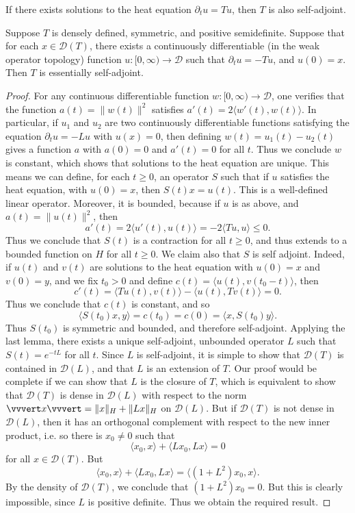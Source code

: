 If there exists solutions to the heat equation $\partial_t u = Tu$, then $T$ is also self-adjoint.

\begin{theorem}
    Suppose $T$ is densely defined, symmetric, and positive semidefinite. Suppose that for each $x \in \mathcal{D}(T)$, there exists a continuously differentiable (in the weak operator topology) function $u: [0,\infty) \to \mathcal{D}$ such that $\partial_t u = - Tu$, and $u(0) = x$. Then $T$ is essentially self-adjoint.
\end{theorem}
\begin{proof}
    For any continuous differentiable function $w: [0,\infty) \to \mathcal{D}$, one verifies that the function $a(t) = \| w(t) \|^2$ satisfies $a'(t) = 2 \langle w'(t), w(t) \rangle$. In particular, if $u_1$ and $u_2$ are two continuously differentiable functions satisfying the equation $\partial_t u = - Lu$ with $u(x) = 0$, then defining $w(t) = u_1(t) - u_2(t)$ gives a function $a$ with $a(0) = 0$ and $a'(t) = 0$ for all $t$. Thus we conclude $w$ is constant, which shows that solutions to the heat equation are unique. This means we can define, for each $t \geq 0$, an operator $S$ such that if $u$ satisfies the heat equation, with $u(0) = x$, then $S(t) x = u(t)$. This is a well-defined linear operator. Moreover, it is bounded, because if $u$ is as above, and $a(t) = \| u(t) \|^2$, then
    \[ a'(t) = 2 \langle u'(t), u(t) \rangle = - 2 \langle Tu, u \rangle \leq 0. \]
    Thus we conclude that $S(t)$ is a contraction for all $t \geq 0$, and thus extends to a bounded function on $H$ for all $t \geq 0$. We claim also that $S$ is self adjoint. Indeed, if $u(t)$ and $v(t)$ are solutions to the heat equation with $u(0) = x$ and $v(0) = y$, and we fix $t_0 > 0$ and define $c(t) = \langle u(t), v(t_0 - t) \rangle$, then
    \[ c'(t) = \langle Tu(t), v(t) \rangle - \langle u(t), Tv(t) \rangle = 0. \]
    Thus we conclude that $c(t)$ is constant, and so
    \[ \langle S(t_0) x, y \rangle = c(t_0) = c(0) = \langle x, S(t_0) y \rangle. \]
    Thus $S(t_0)$ is symmetric and bounded, and therefore self-adjoint. Applying the last lemma, there exists a unique self-adjoint, unbounded operator $L$ such that $S(t) = e^{- t L}$ for all $t$. Since $L$ is self-adjoint, it is simple to show that $\mathcal{D}(T)$ is contained in $\mathcal{D}(L)$, and that $L$ is an extension of $T$. Our proof would be complete if we can show that $L$ is the closure of $T$, which is equivalent to show that $\mathcal{D}(T)$ is dense in $\mathcal{D}(L)$ with respect to the norm $\vvvert x \vvvert = \| x \|_H + \| Lx \|_H$ on $\mathcal{D}(L)$. But if $\mathcal{D}(T)$ is not dense in $\mathcal{D}(L)$, then it has an orthogonal complement with respect to the new inner product, i.e. so there is $x_0 \neq 0$ such that
    \[ \langle x_0, x \rangle + \langle Lx_0, Lx \rangle = 0 \]
    for all $x \in \mathcal{D}(T)$. But
    \[ \langle x_0, x \rangle + \langle Lx_0, Lx \rangle = \langle (1 + L^2) x_0, x \rangle. \]
    By the density of $\mathcal{D}(T)$, we conclude that $(1 + L^2) x_0 = 0$. But this is clearly impossible, since $L$ is positive definite. Thus we obtain the required result.
\end{proof}

